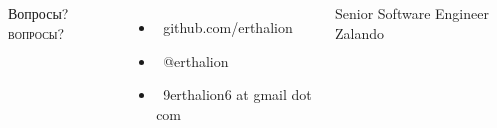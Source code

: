 \documentclass[usenames,dvipsnames, 18pt, compress, aspectratio=169]{beamer}
\def\twitter{{\FA \faTwitter}}
\def\github{{\FA \faGithubSign}}
\def\email{{\FA \faEnvelope}}
\begin{document}
%
\fontsize{17pt}{18}\selectfont
\begin{frame}
  \vspace*{2.5cm}
  \begin{columns}[T,onlytextwidth]
  \begin{minipage}[b][\paperheight]{\textwidth}

      \raggedright%
      \linespread{1.0}%
      \if@noSmallCapitals%
        Вопросы?
      \else%
        \scshape\MakeLowercase{Вопросы?}%
      \fi%
      \vspace*{0.3em}

      \fontsize{13pt}{14}\selectfont
        \begin{itemize}[label={}]
            \item {\github\ github.com/erthalion}
            \item {\twitter\ @erthalion}
            \item \email\ 9erthalion6 at gmail dot com
        \end{itemize}
      \vspace*{2.5em}%

    \begin{columns}[T,onlytextwidth]
      \insertauthor%
      \vspace*{0.5em}%
      Senior Software Engineer
      \vspace*{0.5em}%
      Zalando
      \vspace*{0.5em}%
    \end{columns}

    \vfill
    \vspace*{2em}
  \end{minipage}
  \end{columns}

\end{frame}
\end{document}
